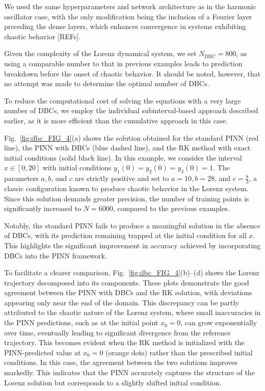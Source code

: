 We used the same hyperparameters and network architecture as in the harmonic oscillator case, with the only modification being the inclusion of a Fourier layer preceding the dense layers, which enhances convergence in systems exhibiting chaotic behavior [REFs].

Given the complexity of the Lorenz dynamical system, we set $N_{\mathrm{DBC}} = 800$, as using a comparable number to that in previous examples leads to prediction breakdown before the onset of chaotic behavior. It should be noted, however, that no attempt was made to determine the optimal number of DBCs.

To reduce the computational cost of solving the equations with a very large number of DBCs, we employ the individual subinterval-based approach described earlier, as it is more efficient than the cumulative approach in this case.

Fig.~\ref{fig:dbc_FIG_4}(a) shows the solution obtained for the standard PINN (red line), the PINN with DBCs (blue dashed line), and the RK method with exact initial conditions (solid black line). In this example, we consider the interval $x \in [0, 20]$ with initial conditions $y_1 (0) = y_2 (0) = y_3 (0) = 1$. The parameters $a, b$, and $c$ are strictly positive and set to $a = 10, b = 28$, and $c = \frac{8}{3}$, a classic configuration known to produce chaotic behavior in the Lorenz system. Since this solution demands greater precision, the number of training points is significantly increased to $N = 6000$, compared to the previous examples.

Notably, the standard PINN fails to produce a meaningful solution in the absence of DBCs, with its prediction remaining trapped at the initial condition for all $x$. This highlights the significant improvement in accuracy achieved by incorporating DBCs into the PINN framework.

To facilitate a clearer comparison, Fig.~\ref{fig:dbc_FIG_4}(b)--(d) shows the Lorenz trajectory decomposed into its components. These plots demonstrate the good agreement between the PINN with DBCs and the RK solution, with deviations appearing only near the end of the domain. This discrepancy can be partly attributed to the chaotic nature of the Lorenz system, where small inaccuracies in the PINN predictions, such as at the initial point $x_0 = 0$, can grow exponentially over time, eventually leading to significant divergence from the reference trajectory. This becomes evident when the RK method is initialized with the PINN-predicted value at $x_0 = 0$ (orange dots) rather than the prescribed initial conditions. In this case, the agreement between the two solutions improves markedly. This indicates that the PINN accurately captures the structure of the Lorenz solution but corresponds to a slightly shifted initial condition.

